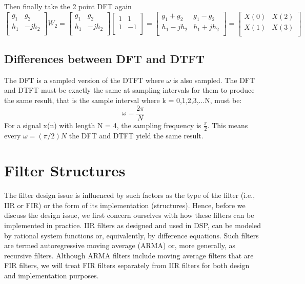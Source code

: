 \documentclass{article}
\begin{document}
Then finally take the 2 point DFT again
\[
\begin{bmatrix}
   g_1 & g_2 \\
    h_1 & -jh_2 \\
\end{bmatrix}W_2=
\begin{bmatrix}
   g_1 & g_2 \\
    h_1 & -jh_2 \\
\end{bmatrix}
\begin{bmatrix}
   1 & 1 \\
    1 & -1 \\
\end{bmatrix}=
\begin{bmatrix}
   g_1+g_2 & g_1-g_2 \\
    h_1-jh_2 & h_1+jh_2 \\
\end{bmatrix}=
\begin{bmatrix}
  X(0) & X(2) \\
    X(1) & X(3) \\
\end{bmatrix}
\]
\subsection{Differences between DFT and DTFT}
The DFT is a sampled version of the DTFT where $\omega$ is also sampled. The DFT and DTFT must be exactly the same at sampling intervals for them to produce the same result, that is the sample interval where k = 0,1,2,3,...N, must be:
\begin{equation}
\omega =\frac{2\pi}{N}
\end{equation}
For a signal x(n) with length N = 4, the sampling frequency is $\frac{\pi}{2}$. This means every $\omega=(\pi /2)N$ the DFT and DTFT yield the same result. 






\section{Filter Structures}
The filter design issue is influenced by such factors as the type of the filter (i.e., IIR or FIR) or the form of its implementation (structures). Hence, before we discuss the design issue, we first concern ourselves with how these filters can be implemented in practice. IIR filters as designed and used in DSP, can be modeled by rational system functions or, equivalently, by difference equations. Such filters are termed autoregressive moving average (ARMA) or, more generally, as recursive filters. Although ARMA filters include moving average filters that are FIR filters, we will treat FIR filters separately from IIR filters for both design and implementation purposes.
\end{document}
